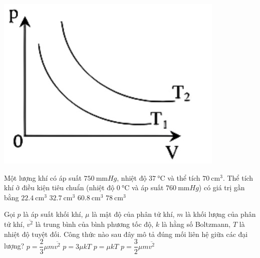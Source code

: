 \begin{ex}
{\vspace{-0.5cm}	\includegraphics[scale=0.4]{../figs/FINAL-SEM1-002-3}}
	\loigiai{}
\end{ex}
\begin{ex}
	Một lượng khí có áp suất $\SI{750}{\milli\meter Hg}$, nhiệt độ $\SI{37}{\celsius}$ và thể tích $\SI{70}{\centi\meter^3}$. Thể tích khí ở điều kiện tiêu chuẩn (nhiệt độ $\SI{0}{\celsius}$ và áp suất $\SI{760}{\milli\meter Hg}$) có giá trị gần bằng
	\choice
	{$\SI{22.4}{\centi\meter^3}$}
	{$\SI{32.7}{\centi\meter^3}$}
	{\True $\SI{60.8}{\centi\meter^3}$}
	{$\SI{78}{\centi\meter^3}$}
\end{ex}
\begin{ex}
Gọi $p$ là áp suất khối khí, $\mu$ là mật độ của phân tử khí, $m$ là khối lượng của phân tử khí, $\overline{v^2}$ là trung bình của bình phương tốc độ, $k$ là hằng số Boltzmann, $T$ là nhiệt độ tuyệt đối. Công thức nào sau đây mô tả đúng mối liên hệ giữa các đại lượng?	
	\choice
	{$p=\dfrac{2}{3}\mu m\overline{v^2}$}
	{$p=3\mu kT$}
	{\True $p=\mu kT$}
	{$p=\dfrac{3}{2}\mu m\overline{v^2}$}
	\loigiai{}
\end{ex}
